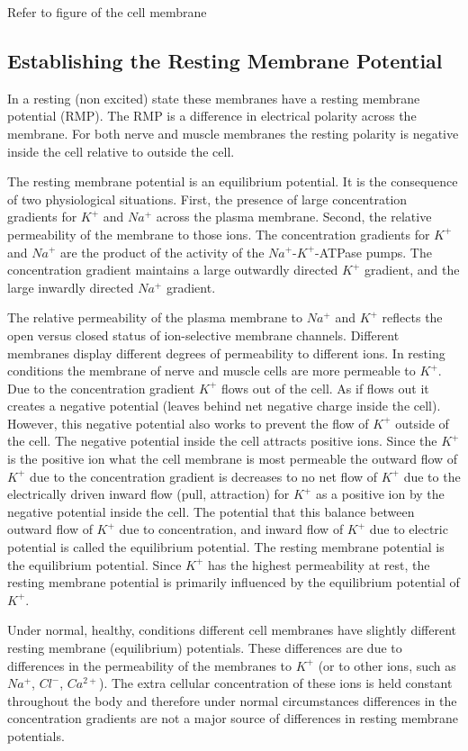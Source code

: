 Refer to figure of the cell membrane

\subsection{Establishing the Resting Membrane Potential}

In a resting (non excited) state these membranes have a resting membrane potential (RMP). The RMP is a difference in electrical polarity across the membrane. For both nerve and muscle membranes the resting polarity is negative inside the cell relative to outside the cell. 


The resting membrane potential is an equilibrium potential. It is the consequence of two physiological situations. First, the presence of large concentration gradients for $K^+$ and $Na^+$ across the plasma membrane. Second, the relative permeability of the membrane to those ions. The concentration gradients for $K^+$ and $Na^+$ are the product of the activity of the $Na^+$-$K^+$-ATPase pumps. The concentration gradient maintains a large outwardly directed $K^+$ gradient, and the large inwardly directed $Na^+$ gradient.

The relative permeability of the plasma membrane to $Na^+$ and $K^+$ reflects the open versus closed status of ion-selective membrane channels. Different membranes display different degrees of permeability to different ions. In resting conditions the membrane of nerve and muscle cells are more permeable to $K^+$. Due to the concentration gradient $K^+$ flows out of the cell. As if flows out it creates a negative potential (leaves behind net negative charge inside the cell). However, this negative potential also works to prevent the flow of $K^+$ outside of the cell. The negative potential inside the cell attracts positive ions. Since the $K^+$ is the positive ion what the cell membrane is most permeable the outward flow of $K^+$ due to the concentration gradient is decreases to no net flow of $K^+$ due to the electrically driven inward flow (pull, attraction) for $K^+$ as a positive ion by the negative potential inside the cell. The potential that this balance between outward flow of $K^+$ due to concentration, and inward flow of $K^+$ due to electric potential is called the equilibrium potential. The resting membrane potential is the equilibrium potential. Since $K^+$ has the highest permeability at rest, the resting membrane potential is primarily influenced by the equilibrium potential of $K^+$.

Under normal, healthy, conditions different cell membranes have slightly different resting membrane (equilibrium) potentials. These differences are due to differences in the permeability of the membranes to $K^+$ (or to other ions, such as $Na^+$, $Cl^-$, $Ca^{2+}$). The extra cellular concentration of these ions is held constant throughout the body and therefore under normal circumstances differences in the concentration gradients are not a major source of differences in resting membrane potentials. 


